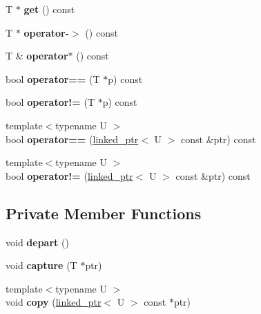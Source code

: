 \begin{DoxyCompactItemize}
T $\ast$ {\bfseries get} () const
\item 
\mbox{\label{classtesting_1_1internal_1_1linked__ptr_a23ff85ac97eed03e945034b65c8eb900}} 
T $\ast$ {\bfseries operator-\/$>$} () const
\item 
\mbox{\label{classtesting_1_1internal_1_1linked__ptr_ac94ad266bf41cbf979a95ca2870908d9}} 
T \& {\bfseries operator$\ast$} () const
\item 
\mbox{\label{classtesting_1_1internal_1_1linked__ptr_ad87ac8ff5543b6fad66e2f3c9844581a}} 
bool {\bfseries operator==} (T $\ast$p) const
\item 
\mbox{\label{classtesting_1_1internal_1_1linked__ptr_a10305395af92bd2fec7bca085cabc99c}} 
bool {\bfseries operator!=} (T $\ast$p) const
\item 
\mbox{\label{classtesting_1_1internal_1_1linked__ptr_a79306e959a4ae7b3a9da641d2ba06ce6}} 
{\footnotesize template$<$typename U $>$ }\\bool {\bfseries operator==} (\hyperlink{classtesting_1_1internal_1_1linked__ptr}{linked\+\_\+ptr}$<$ U $>$ const \&ptr) const
\item 
\mbox{\label{classtesting_1_1internal_1_1linked__ptr_a4801114a83a9e12b08f90e0d28318f26}} 
{\footnotesize template$<$typename U $>$ }\\bool {\bfseries operator!=} (\hyperlink{classtesting_1_1internal_1_1linked__ptr}{linked\+\_\+ptr}$<$ U $>$ const \&ptr) const
\end{DoxyCompactItemize}
\subsection*{Private Member Functions}
\begin{DoxyCompactItemize}
\item 
\mbox{\label{classtesting_1_1internal_1_1linked__ptr_a0852ab20839140f29b2ad074339fccc7}} 
void {\bfseries depart} ()
\item 
\mbox{\label{classtesting_1_1internal_1_1linked__ptr_a0b4623795339fd29bf9303f926ae2824}} 
void {\bfseries capture} (T $\ast$ptr)
\item 
\mbox{\label{classtesting_1_1internal_1_1linked__ptr_aea2859970b65708fc4f7c8c4cbc7928a}} 
{\footnotesize template$<$typename U $>$ }\\void {\bfseries copy} (\hyperlink{classtesting_1_1internal_1_1linked__ptr}{linked\+\_\+ptr}$<$ U $>$ const $\ast$ptr)
\end{DoxyCompactItemize}
